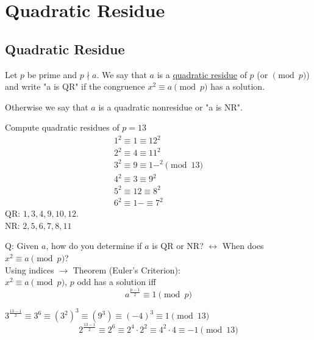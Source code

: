 \section{Quadratic Residue}
    \subsection{Quadratic Residue}
    \begin{definition}
        Let $p$ be prime and $p\nmid a$. We say that $a$ is a \underline{quadratic residue}
        of $p$ (or $\pmod{p}$) and write "a is QR" if the congruence
        $x^2\equiv a\pmod{p}$ has a solution.

        Otherwise we say that $a$ is a quadratic nonresidue or "a is NR".
    \end{definition}
    \begin{example}
        Compute quadratic residues of $p=13$
        \begin{align*}
            1^2\equiv 1\equiv 12^2 \\
            2^2\equiv 4\equiv 11^2 \\
            3^2\equiv 9\equiv 1-^2 \pmod{13} \\
            4^2\equiv 3\equiv 9^2 \\
            5^2\equiv 12\equiv 8^2 \\
            6^2\equiv 1-\equiv 7^2
        \end{align*}
        QR: $1,3,4,9,10,12$. \\
        NR: $2,5,6,7,8,11$
    \end{example}

    Q: Given $a$, how do you determine if $a$ is QR or NR?
    $\leftrightarrow$ When does $x^2\equiv a\pmod{p}$? \\
    Using indices $\rightarrow$ Theorem (Euler's Criterion): \\
    $x^2\equiv a\pmod{p}$, $p$ odd has a solution iff
    \[
        a^{\frac{p-1}{2}}\equiv 1\pmod{p}
    \]

    \begin{example}
        $3^{\frac{13-1}{2}}\equiv 3^6 \equiv (3^2)^3\equiv (9^3) \equiv (-4)^3\equiv 1\pmod{13}$ \\
        \[
            2^{\frac{13-1}{2}}\equiv 2^6\equiv 2^4\cdot 2^2\equiv 4^2\cdot 4\equiv -1\pmod{13}
        \]
    \end{example}

